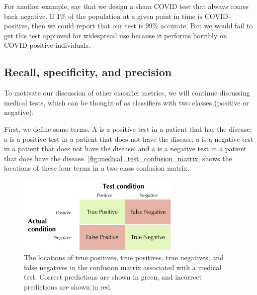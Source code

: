 For another example, say that we design a sham COVID test that always comes back negative. If 1\% of the population at a given point in time is COVID-positive, then we could report that our test is 99\% accurate. But we would fail to get this test approved for widespread use because it performs horribly on COVID-positive individuals.\\

\begin{qbox}\end{qbox}

\FloatBarrier
{}
\subsection{Recall, specificity, and precision}

To motivate our discussion of other classifier metrics, we will continue discussing medical tests, which can be thought of as classifiers with two classes (positive or negative).

First, we define some terms. A  is a positive test in a patient that has the disease; a  is a positive test in a patient that does not have the disease; a  is a negative test in a patient that does not have the disease; and a  is a negative test in a patient that does have the disease. \autoref{fig:medical_test_confusion_matrix} shows the locations of these four terms in a two-class confusion matrix.\\

\begin{figure}[h]
\centering
\mySfFamily
\includegraphics[width = 0.7\textwidth]{../images/medical_test_confusion_matrix.png}
\caption{The locations of true positives, true positives, true negatives, and false negatives in the confusion matrix associated with a medical test. Correct predictions are shown in green, and incorrect predictions are shown in red.}
\label{fig:medical_test_confusion_matrix}
\end{figure}

